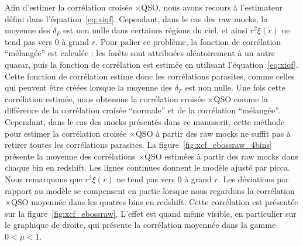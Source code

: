 Afin d'estimer la corrélation croisée \lya{}$\times$QSO, nous avons recours à l'estimateur défini dans l'équation~\ref{eq:xiqf}.
Cependant, dans le cas des raw mocks, la moyenne des $\delta_F$ est non nulle dans certaines régions du ciel, et ainsi $r^2\xi(r)$ ne tend pas vers 0 à grand $r$.
Pour palier ce problème, la fonction de corrélation ``mélangée'' est calculée : les forêts sont attribuées aléatoirement à un autre quasar, puis la fonction de corrélation est estimée en utilisant l'équation~\ref{eq:xiqf}.
Cette fonction de corrélation estime donc les corrélations parasites, comme celles qui peuvent être créées lorsque la moyenne des $\delta_F$ est non nulle.
Une fois cette corrélation estimée, nous obtenons la corrélation croisée \lya{}$\times$QSO comme la différence de la corrélation croisée ``normale'' et de la corrélation ``mélangée''.
Cependant, dans le cas des mocks présentés dans ce manuscrit, cette méthode pour estimer la corrélation croisée \lya{}$\times$QSO à partir des raw mocks ne suffit pas à retirer toutes les corrélations parasites.
La figure~\ref{fig:xcf_ebossraw_4bins} présente la moyenne des \Nmocks{} corrélations \lya{}$\times$QSO estimées à partir des raw mocks dans  chaque bin en redshift. Les lignes continues donnent le modèle ajusté par picca. Nous remarquons que $r^2\xi(r)$ ne tend pas vers 0 à grand $r$.
Les déviations par rapport au modèle se compensent en partie lorsque nous regardons la corrélation \lya{}$\times$QSO moyennée dans les quatres bins en redshift. Cette corrélation est présentée sur la figure~\ref{fig:xcf_ebossraw}. L'effet est quand même visible, en particulier sur le graphique de droite, qui présente la corrélation moyennée dans la gamme $0 < \mu < 1$.

